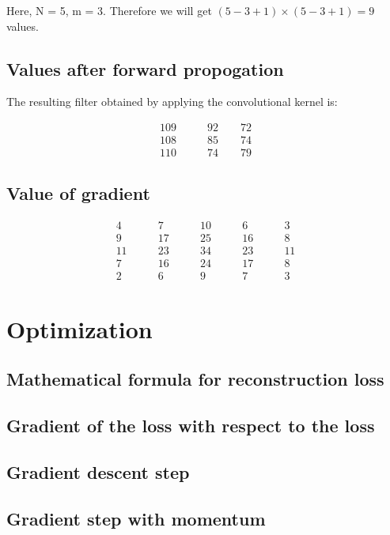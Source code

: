 \documentclass{article}
\begin{document}
Here, N = 5, m = 3.
Therefore we will get $(5-3+1) \times (5-3+1) = 9$ values.
\subsection{Values after forward propogation}
The resulting filter obtained by applying the convolutional kernel is:
\begin{centering}
  \begin{align*}
  109 &\qquad 92 \qquad 72 \\
  108 &\qquad 85 \qquad 74 \\
  110 &\qquad 74 \qquad 79
  \end{align*}
\end{centering}

\subsection{Value of gradient}
\begin{centering}
\begin{align*}
4 & \qquad 7 & \qquad 10 &\qquad 6 & \qquad 3\\
9 & \qquad 17 &\qquad  25 & \qquad  16 & \qquad   8\\
11 & \qquad 23 & \qquad  34 & \qquad  23 & \qquad  11\\
7 & \qquad 16 & \qquad  24 & \qquad  17 & \qquad   8\\
2 & \qquad 6 & \qquad 9 & \qquad   7 & \qquad   3
\end{align*}
\end{centering}

\section{Optimization}
\subsection{Mathematical formula for reconstruction loss}
\subsection{Gradient of the loss with respect to the loss}
\subsection{Gradient descent step}
\subsection{Gradient step with momentum}
\end{document}
